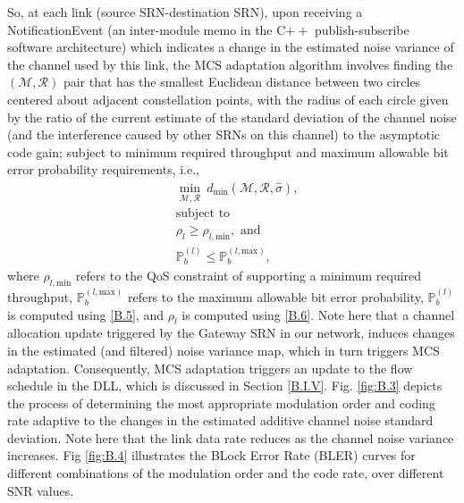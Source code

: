So, at each link (source SRN-destination SRN), upon receiving a NotificationEvent (an inter-module memo in the C${++}$ publish-subscribe software architecture) which indicates a change in the estimated noise variance of the channel used by this link, the MCS adaptation algorithm involves finding the $(\mathcal{M},\mathcal{R})$ pair that has the smallest Euclidean distance between two circles centered about adjacent constellation points, with the radius of each circle given by the ratio of the current estimate of the standard deviation of the channel noise (and the interference caused by other SRNs on this channel) to the asymptotic code gain; subject to minimum required throughput and maximum allowable bit error probability requirements, i.e.,
\begin{equation}\label{B.7}
    \begin{aligned}
        &\min_{\mathcal{M},\mathcal{R}}\ d_{\text{min}}(\mathcal{M},\mathcal{R},\hat{\sigma}),\\
        &\text{subject to}\\
        &\rho_{l} \geq \rho_{l,\text{min}},\text{ and}\\
        &\mathbb{P}_{b}^{(l)} \leq \mathbb{P}_{b}^{(l,\text{max})},
    \end{aligned}
\end{equation}
where $\rho_{l,\text{min}}$ refers to the QoS constraint of supporting a minimum required throughput, $\mathbb{P}_{b}^{(l,\text{max})}$ refers to the maximum allowable bit error probability, $\mathbb{P}_{b}^{(l)}$ is computed using \eqref{B.5}, and $\rho_{l}$ is computed using \eqref{B.6}. Note here that a channel allocation update triggered by the Gateway SRN in our network, induces changes in the estimated (and filtered) noise variance map, which in turn triggers MCS adaptation. Consequently, MCS adaptation triggers an update to the flow schedule in the DLL, which is discussed in Section \ref{B.I.V}. Fig. \ref{fig:B.3} depicts the process of determining the most appropriate modulation order and coding rate adaptive to the changes in the estimated additive channel noise standard deviation. Note here that the link data rate reduces as the channel noise variance increases. Fig \ref{fig:B.4} illustrates the BLock Error Rate (BLER) curves for different combinations of the modulation order and the code rate, over different SNR values.
